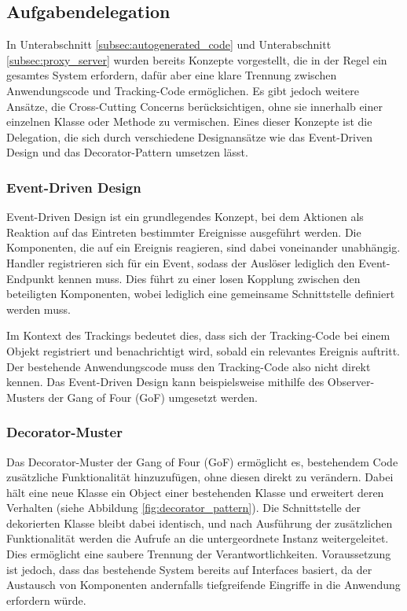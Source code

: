 \subsection{Aufgabendelegation}
\label{subsec:task_delegation}
In Unterabschnitt \ref{subsec:autogenerated_code} und Unterabschnitt \ref{subsec:proxy_server} wurden bereits Konzepte vorgestellt, die in der Regel ein gesamtes System erfordern, dafür aber eine klare Trennung zwischen Anwendungscode und Tracking-Code ermöglichen.  
Es gibt jedoch weitere Ansätze, die Cross-Cutting Concerns \cite{crosscutting} berücksichtigen, ohne sie innerhalb einer einzelnen Klasse oder Methode zu vermischen.  
Eines dieser Konzepte ist die Delegation, die sich durch verschiedene Designansätze wie das Event-Driven Design und das Decorator-Pattern umsetzen lässt.

\subsubsection{Event-Driven Design}
\label{subsubsec:event_driven_design}
Event-Driven Design ist ein grundlegendes Konzept, bei dem Aktionen als Reaktion auf das Eintreten bestimmter Ereignisse ausgeführt werden.  
Die Komponenten, die auf ein Ereignis reagieren, sind dabei voneinander unabhängig.  
Handler registrieren sich für ein Event, sodass der Auslöser lediglich den Event-Endpunkt kennen muss.  
Dies führt zu einer losen Kopplung zwischen den beteiligten Komponenten, wobei lediglich eine gemeinsame Schnittstelle definiert werden muss.  

Im Kontext des Trackings bedeutet dies, dass sich der Tracking-Code bei einem Objekt registriert und benachrichtigt wird, sobald ein relevantes Ereignis auftritt. Der bestehende Anwendungscode muss den Tracking-Code also nicht direkt kennen. Das Event-Driven Design kann beispielsweise mithilfe des Observer-Musters der Gang of Four (GoF) \cite{gamma1995design} umgesetzt werden.

\subsubsection{Decorator-Muster}
Das Decorator-Muster der Gang of Four (GoF) \cite{gamma1995design} ermöglicht es, bestehendem Code zusätzliche Funktionalität hinzuzufügen, ohne diesen direkt zu verändern.  
Dabei hält eine neue Klasse ein Object einer bestehenden Klasse und erweitert deren Verhalten (siehe Abbildung \ref{fig:decorator_pattern}). 
Die Schnittstelle der dekorierten Klasse bleibt dabei identisch, und nach Ausführung der zusätzlichen Funktionalität werden die Aufrufe an die untergeordnete Instanz weitergeleitet. Dies ermöglicht eine saubere Trennung der Verantwortlichkeiten. Voraussetzung ist jedoch, dass das bestehende System bereits auf Interfaces basiert, da der Austausch von Komponenten andernfalls tiefgreifende Eingriffe in die Anwendung erfordern würde.

